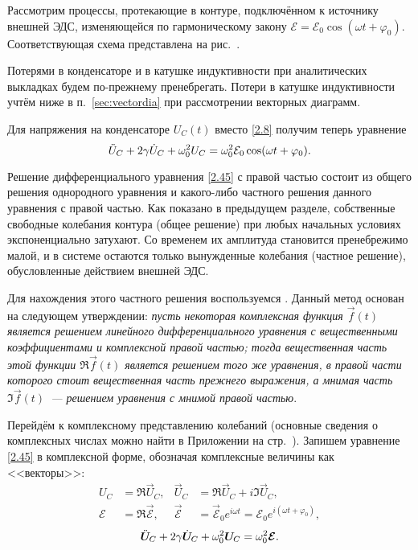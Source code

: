 Рассмотрим процессы, протекающие в контуре, подключённом к источнику внешней
ЭДС, изменяющейся по гармоническому закону
$\mathcal{E}=\mathcal{E}_0\cos(\omega t+\varphi_0)$. Соответствующая схема
представлена на рис.~.

Потерями в конденсаторе и в катушке индуктивности при аналитических выкладках
будем по-прежнему пренебрегать.
Потери в катушке индуктивности учтём ниже в п.~\ref{sec:vectordia} 
при рассмотрении векторных диаграмм.

Для напряжения на конденсаторе $U_C(t)$ вместо \eqref{2.8} получим теперь
уравнение
\begin{equation}\eqmark{2.45}
\ddot{U}_C+2\gamma \dot{U}_C+\omega_0^2U_C=\omega_0^2\mathcal{E}_0\cos(\omega t+
\varphi_0).
\end{equation}


Решение  дифференциального уравнения \eqref{2.45} с правой
частью состоит из общего решения однородного уравнения и какого-либо частного
решения данного уравнения с правой частью. Как показано в предыдущем разделе,
собственные свободные колебания контура (общее решение) при любых начальных
условиях экспоненциально затухают. Со временем их амплитуда становится
пренебрежимо малой, и в системе остаются только вынужденные колебания (частное
решение), обусловленные действием внешней ЭДС. 

Для нахождения этого частного
решения воспользуемся . Данный метод
основан на следующем утверждении: \emph{пусть некоторая комплексная функция
$\vec{f}(t)$ является решением линейного дифференциального уравнения 
с вещественными коэффициентами и комплексной правой частью; 
тогда вещественная часть этой 
функции $\Re \vec{f}(t)$ является решением того же уравнения, 
в правой части которого стоит вещественная часть прежнего выражения, 
а мнимая часть $\Im \vec{f}(t)$~--- решением уравнения с мнимой правой частью}.

Перейдём к комплексному представлению 
колебаний (основные сведения о комплексных числах можно найти
в Приложении на стр.~\pageref{sec:cplx}). 
Запишем уравнение \eqref{2.45} в комплексной форме, 
обозначая комплексные величины как <<векторы>>:
\begin{equation}
\begin{aligned}
U_C &= \Re \vec{U}_{\! C}, & \vec{U}_{\! C} &= \Re \vec{U}_{\! C}+i\Im \vec{U}_{\! C}, \\
\mathcal{E}&=\Re \vec{\mathcal{E}}, & \vec{\mathcal{E}}&=
\vec{\mathcal{E}}_0e^{i\omega t}=\mathcal{E}_0 e^{i(\omega t+\varphi_0)},
\end{aligned}
\end{equation}
\begin{equation}\eqmark{2.46}
\ddot{\vec U}_{\! C}+2\gamma\dot{\vec U}_{\! C}+
\omega_0^2 \vec{U}_{\! C}=\omega_0^2\vec{\mathcal{E}}.
\end{equation}


